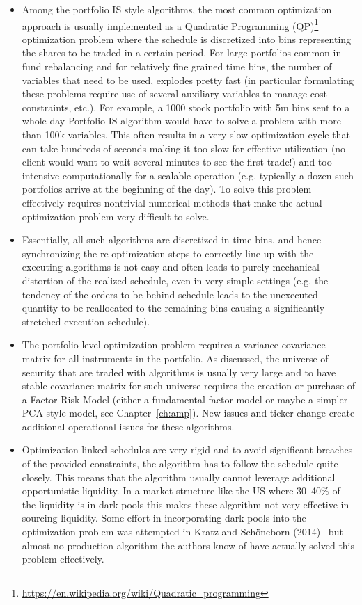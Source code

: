 \begin{itemize}
\item Among the portfolio IS style algorithms, the most common optimization approach is usually implemented as a Quadratic Programming (QP)\footnote{\url{https://en.wikipedia.org/wiki/Quadratic_programming}} optimization problem where the schedule is discretized into bins representing the shares to be traded in a certain period.  For large portfolios common in fund rebalancing and for relatively fine grained time bins, the number of variables that need to be used, explodes pretty fast (in particular formulating these problems require use of several auxiliary variables to manage cost constraints, etc.). For example, a 1000 stock portfolio with 5m bins  sent to a whole day Portfolio IS algorithm would have to solve a problem with more than 100k variables. This often results in a very slow  optimization cycle that can take hundreds of seconds making it too slow for effective utilization (no client would want to wait several minutes to see the first trade!) and too intensive computationally for a scalable operation  (e.g. typically a dozen such portfolios arrive at the beginning of the day). To solve this problem effectively requires nontrivial numerical methods that make the actual optimization problem very difficult to solve.

\item Essentially, all such algorithms are discretized in time bins, and hence synchronizing the re-optimization steps to correctly line up with the executing algorithms is not easy and often leads to purely mechanical distortion of the realized schedule, even in very simple settings (e.g. the tendency of the orders to be behind schedule leads to the unexecuted quantity to be reallocated to the remaining bins causing a significantly stretched execution schedule).

\item The portfolio level optimization problem requires a variance-covariance matrix for all instruments in the portfolio. As discussed, the universe of security that are traded with algorithms is usually very large and to have stable covariance matrix for such universe requires the creation or purchase of a Factor Risk Model (either a fundamental factor model or maybe a simpler PCA style model, see Chapter~\ref{ch:amp}). New issues and ticker change create additional operational issues for these algorithms.

\item Optimization linked schedules are very rigid and to avoid significant breaches of the provided constraints, the algorithm has to follow the schedule quite closely. This means that the algorithm usually cannot leverage additional opportunistic liquidity. In a market structure like the US where 30--40\% of the liquidity is in dark pools this makes these algorithm not very effective in sourcing liquidity. Some effort in incorporating dark pools into the optimization problem was attempted in Kratz and Sch\"oneborn (2014)~\cite{kratzschon} but almost no production algorithm the authors know of have actually solved this problem effectively. 
\end{itemize}



